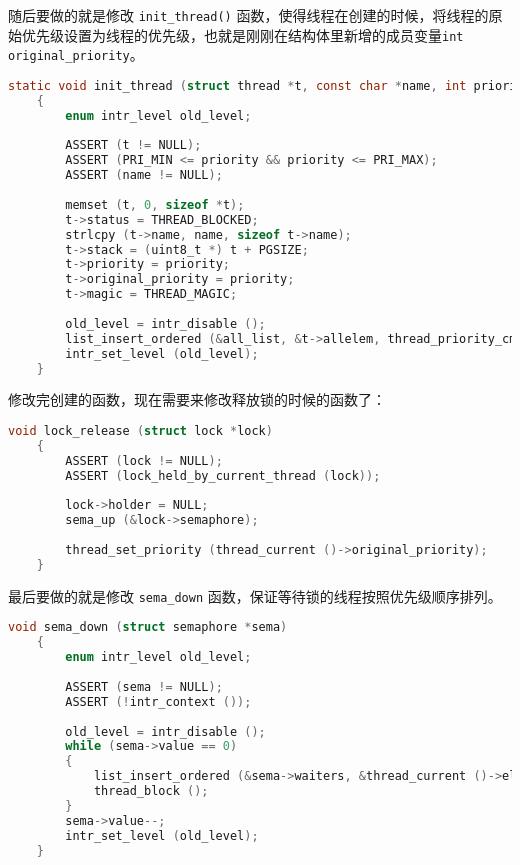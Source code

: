 \documentclass{article}
\begin{document}
	随后要做的就是修改 \texttt{init\_thread()} 函数，使得线程在创建的时候，将线程的原始优先级设置为线程的优先级，也就是刚刚在结构体里新增的成员变量\texttt{int original\_priority}。
	
	\begin{lstlisting}[language=C, title=修改后的\texttt{init\_thread()}函数]
    static void init_thread (struct thread *t, const char *name, int priority)
    {
    	enum intr_level old_level;
    	
    	ASSERT (t != NULL);
    	ASSERT (PRI_MIN <= priority && priority <= PRI_MAX);
    	ASSERT (name != NULL);
    	
    	memset (t, 0, sizeof *t);
    	t->status = THREAD_BLOCKED;
    	strlcpy (t->name, name, sizeof t->name);
    	t->stack = (uint8_t *) t + PGSIZE;
    	t->priority = priority;
    	t->original_priority = priority;
    	t->magic = THREAD_MAGIC;
    	
    	old_level = intr_disable ();
    	list_insert_ordered (&all_list, &t->allelem, thread_priority_cmp, NULL);
    	intr_set_level (old_level);
    }
	\end{lstlisting}
	
	修改完创建的函数，现在需要来修改释放锁的时候的函数了：
	
	\newpage
	
	\begin{lstlisting}[language=C, title=修改后的\texttt{lock\_release()}函数]
    void lock_release (struct lock *lock) 
    {
    	ASSERT (lock != NULL);
    	ASSERT (lock_held_by_current_thread (lock));
    	
    	lock->holder = NULL;
    	sema_up (&lock->semaphore);
    	
    	thread_set_priority (thread_current ()->original_priority);
    }
	\end{lstlisting}
	
	最后要做的就是修改 \texttt{sema\_down} 函数，保证等待锁的线程按照优先级顺序排列。
	
	\begin{lstlisting}[language=C, title=修改后的\texttt{sema\_down()}函数]
    void sema_down (struct semaphore *sema) 
    {
    	enum intr_level old_level;
    	
    	ASSERT (sema != NULL);
    	ASSERT (!intr_context ());
    	
    	old_level = intr_disable ();
    	while (sema->value == 0) 
    	{
    		list_insert_ordered (&sema->waiters, &thread_current ()->elem, thread_priority_cmp, NULL);
    		thread_block ();
    	}
    	sema->value--;
    	intr_set_level (old_level);
    }
	\end{lstlisting}
	
\end{document}
